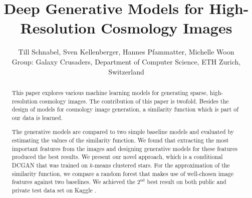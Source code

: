 \documentclass[10pt,conference,compsocconf]{IEEEtran}
\newcommand\TODO[1]{\textcolor{red}{#1}} %
\begin{document}
\title{Deep Generative Models for High-Resolution Cosmology Images}

\author{Till Schnabel, Sven Kellenberger, Hannes Pfammatter, Michelle Woon \\Group: Galaxy Crusaders, Department of Computer Science, ETH Zurich, Switzerland}

\maketitle

\begin{abstract}
This paper explores various machine learning models for generating sparse, high-resolution cosmology images. %
The contribution of this paper is twofold. Besides the design of models for cosmology image generation, a similarity function which is part of our data is learned.

The generative models are compared to two simple baseline models and evaluated by estimating the values of the similarity function. We found that extracting the most important features from the images and designing generative models for these features produced the best results. We present our novel approach, which is a conditional DCGAN that was trained on $k$-means clustered stars. For the approximation of the similarity function, we compare a random forest that makes use of well-chosen image features against two baselines. We achieved the $2^{\text{nd}}$ best result on both public and private test data set on Kaggle \cite{Kaggle}.






\end{abstract}
\end{document}
